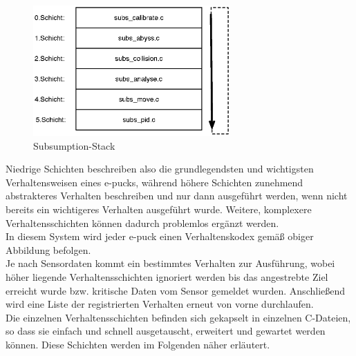 \documentclass[10pt,a4paper]{article}
\begin{document}
			\begin{figure}[h]
				\centering
				\includegraphics[height=5cm]{images/subsumption.eps}
				\caption{Subsumption-Stack}		
				\label{fig:subsumption}	
			\end{figure}

			Niedrige Schichten beschreiben also die grundlegendsten und wichtigsten Verhaltensweisen eines e-pucks, während höhere Schichten zunehmend
			abstrakteres Verhalten beschreiben und nur dann ausgeführt werden, wenn nicht bereits ein wichtigeres Verhalten ausgeführt wurde. Weitere,
			komplexere Verhaltensschichten können dadurch problemlos ergänzt werden.\\ 
			In diesem System wird jeder e-puck einen Verhaltenskodex gemäß obiger Abbildung befolgen. \\
			Je nach Sensordaten kommt ein bestimmtes Verhalten zur Ausführung, wobei höher liegende Verhaltensschichten ignoriert werden bis das
			angestrebte Ziel erreicht wurde bzw. kritische Daten vom Sensor gemeldet wurden. Anschließend wird eine Liste der registrierten Verhalten
			erneut von vorne durchlaufen. \\
			Die einzelnen Verhaltensschichten befinden sich gekapselt in einzelnen C-Dateien, so dass sie einfach und schnell ausgetauscht, erweitert und
			gewartet werden können. Diese Schichten werden im Folgenden näher erläutert. \\
\end{document}
